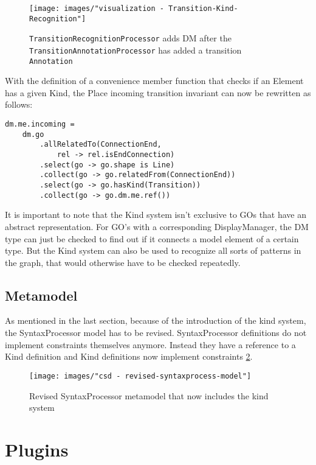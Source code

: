 \begin{figure}[ht]
\centering
\texttt{[image: images/"visualization - Transition-Kind-Recognition"]}
\caption{\texttt{TransitionRecognitionProcessor} adds DM after the \texttt{TransitionAnnotationProcessor} has added a transition \texttt{Annotation}}
\label{fig:Transition-Kind-Recognition}
\end{figure}

With the definition of a convenience member function that checks if an Element has a given Kind, the Place incoming transition invariant can now be rewritten as follows: 
\begin{lstlisting}[language=OCL]
dm.me.incoming = 
    dm.go
        .allRelatedTo(ConnectionEnd, 
            rel -> rel.isEndConnection)
        .select(go -> go.shape is Line)
        .collect(go -> go.relatedFrom(ConnectionEnd))
        .select(go -> go.hasKind(Transition))
        .collect(go -> go.dm.me.ref())
\end{lstlisting}


It is important to note that the Kind system isn't exclusive to GOs that have an abstract representation. For GO's with a corresponding DisplayManager, the DM type can just be checked to find out if it connects a model element of a certain type. But the Kind system can also be used to recognize all sorts of patterns in the graph, that would otherwise have to be checked repeatedly.

\subsection{Metamodel}
As mentioned in the last section, because of the introduction of the kind system, the SyntaxProcessor model has to be revised. SyntaxProcessor definitions do not implement constraints themselves anymore. Instead they have a reference to a Kind definition and Kind definitions now implement constraints \ref{fig:revised-syntax-model}. 

\begin{figure}
\centering
\texttt{[image: images/"csd - revised-syntaxprocess-model"]}
\caption{Revised SyntaxProcessor metamodel that now includes the kind system}
\label{fig:revised-syntax-model}
\end{figure}


\section{Plugins}

